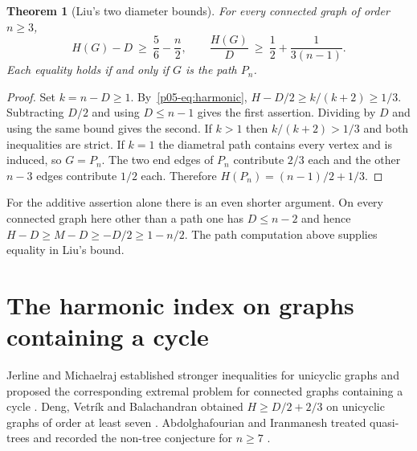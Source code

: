 \documentclass[11pt,a4paper]{article}
\newtheorem{theorem}{Theorem}[section]
\begin{document}
\begin{theorem}[Liu's two diameter bounds]\label{p05-thm:liu}
For every connected graph of order $n\ge3$,
\[
 H(G)-D\ \ge\ \frac56-\frac n2,\qquad
 \frac{H(G)}{D}\ \ge\ \frac12+\frac{1}{3(n-1)}.
\]
Each equality holds if and only if $G$ is the path $P_n$.
\end{theorem}
\begin{proof}
Set $k=n-D\ge1$. By~\eqref{p05-eq:harmonic},
$H-D/2\ge k/(k+2)\ge1/3$. Subtracting $D/2$ and using
$D\le n-1$ gives the first assertion. Dividing by $D$ and using
the same bound gives the second. If $k>1$ then $k/(k+2)>1/3$
and both inequalities are strict. If $k=1$ the diametral path
contains every vertex and is induced, so $G=P_n$. The two end edges
of $P_n$ contribute $2/3$ each and the other $n-3$ edges
contribute $1/2$ each. Therefore $H(P_n)=(n-1)/2+1/3$.
\end{proof}

For the additive assertion alone there is an even shorter argument.
On every connected graph here other than a path one has $D\le n-2$ and hence
$H-D\ge M-D\ge-D/2\ge1-n/2$. The path computation above
supplies equality in Liu's bound.

\section{The harmonic index on graphs containing a cycle}\label{p05-sec:nontree}
Jerline and Michaelraj established stronger inequalities for unicyclic graphs
and proposed the corresponding extremal problem for connected graphs
containing a cycle \cite{p05-JM}. Deng, Vetr\'ik and Balachandran obtained
$H\ge D/2+2/3$ on unicyclic graphs of order at least seven \cite{p05-DVB}. Abdolghafourian and Iranmanesh treated
quasi-trees and recorded the non-tree conjecture for $n\ge7$
\cite[Conjecture~2]{p05-AI}.
\end{document}
